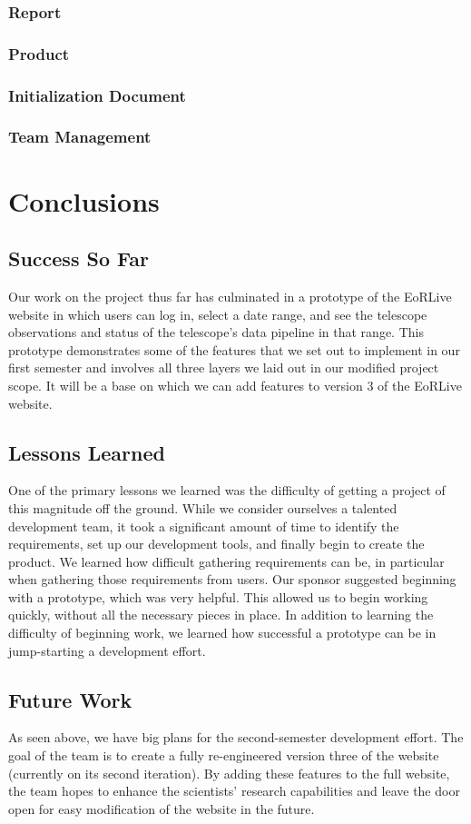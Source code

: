 \documentclass[12pt]{article}
\begin{document}
\begin{spacing}{1.5}
\subsubsection{Report}
\subsubsection{Product}
\subsubsection{Initialization Document}
\subsubsection{Team Management}

\clearpage

\section{Conclusions}
\subsection{Success So Far}
Our work on the project thus far has culminated in a prototype of the EoRLive website in which users can log in, select a date range, and see the telescope observations and status of the telescope's data pipeline in that range. This prototype demonstrates some of the features that we set out to implement in our first semester and involves all three layers we laid out in our modified project scope. It will be a base on which we can add features to version 3 of the EoRLive website.
\subsection{Lessons Learned}
One of the primary lessons we learned was the difficulty of getting a project of this magnitude off the ground. While we consider ourselves a talented development team, it took a significant amount of time to identify the requirements, set up our development tools, and finally begin to create the product. We learned how difficult gathering requirements can be, in particular when gathering those requirements from users. Our sponsor suggested beginning with a prototype, which was very helpful. This allowed us to begin working quickly, without all the necessary pieces in place. In addition to learning the difficulty of beginning work, we learned how successful a prototype can be in jump-starting a development effort.
\subsection{Future Work}
As seen above, we have big plans for the second-semester development effort. The goal of the team is to create a fully re-engineered version three of the website (currently on its second iteration). By adding these features to the full website, the team hopes to enhance the scientists' research capabilities and leave the door open for easy modification of the website in the future.

\end{spacing}
\end{document}
